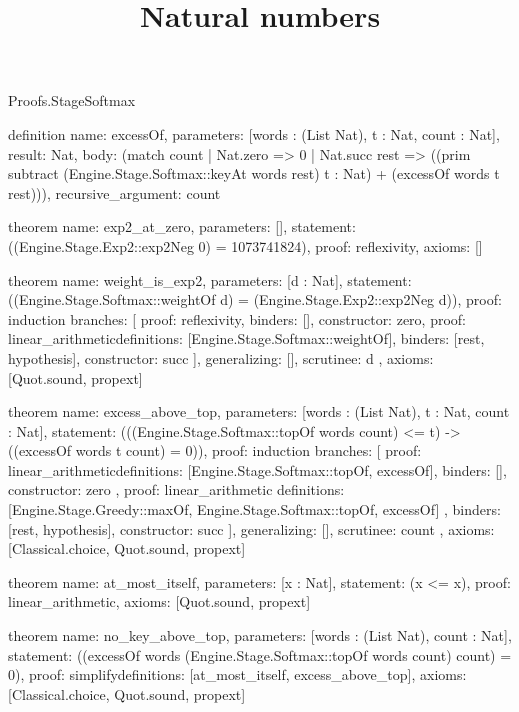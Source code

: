 \begin{lexlean}{Proofs.StageSoftmax}
\title{Natural numbers}
\begin{semanticmodule}
definition{
  name: excessOf,
  parameters: [words : (List Nat), t : Nat, count : Nat],
  result: Nat,
  body: (match count
    | Nat.zero => 0
    | Nat.succ rest => ((prim subtract (Engine.Stage.Softmax::keyAt words rest) t : Nat) + (excessOf words t rest))),
  recursive_argument: count
}

theorem{
  name: exp2_at_zero,
  parameters: [],
  statement: ((Engine.Stage.Exp2::exp2Neg 0) = 1073741824),
  proof: reflexivity{},
  axioms: []
}

theorem{
  name: weight_is_exp2,
  parameters: [d : Nat],
  statement: ((Engine.Stage.Softmax::weightOf d) = (Engine.Stage.Exp2::exp2Neg d)),
  proof: induction{
    branches: [
      {proof: reflexivity{}, binders: [], constructor: zero},
      {
        proof: linear_arithmetic{definitions: [Engine.Stage.Softmax::weightOf]},
        binders: [rest, hypothesis],
        constructor: succ
      }
    ],
    generalizing: [],
    scrutinee: d
  },
  axioms: [Quot.sound, propext]
}

theorem{
  name: excess_above_top,
  parameters: [words : (List Nat), t : Nat, count : Nat],
  statement: (((Engine.Stage.Softmax::topOf words count) <= t) -> ((excessOf words t count) = 0)),
  proof: induction{
    branches: [
      {
        proof: linear_arithmetic{definitions: [Engine.Stage.Softmax::topOf, excessOf]},
        binders: [],
        constructor: zero
      },
      {
        proof: linear_arithmetic{
          definitions: [Engine.Stage.Greedy::maxOf, Engine.Stage.Softmax::topOf, excessOf]
        },
        binders: [rest, hypothesis],
        constructor: succ
      }
    ],
    generalizing: [],
    scrutinee: count
  },
  axioms: [Classical.choice, Quot.sound, propext]
}

theorem{
  name: at_most_itself,
  parameters: [x : Nat],
  statement: (x <= x),
  proof: linear_arithmetic{},
  axioms: [Quot.sound, propext]
}

theorem{
  name: no_key_above_top,
  parameters: [words : (List Nat), count : Nat],
  statement: ((excessOf words (Engine.Stage.Softmax::topOf words count) count) = 0),
  proof: simplify{definitions: [at_most_itself, excess_above_top]},
  axioms: [Classical.choice, Quot.sound, propext]
}


\end{semanticmodule}
\end{lexlean}
